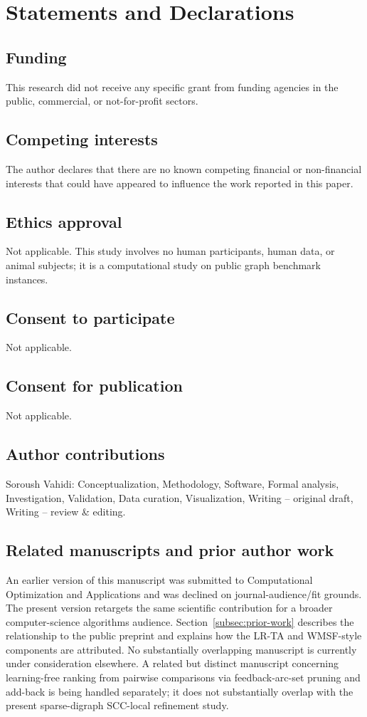 \section*{Statements and Declarations}

\subsection*{Funding}
This research did not receive any specific grant from funding agencies in the public, commercial, or not-for-profit sectors.

\subsection*{Competing interests}
The author declares that there are no known competing financial or non-financial interests that could have appeared to influence the work reported in this paper.

\subsection*{Ethics approval}
Not applicable. This study involves no human participants, human data, or animal subjects; it is a computational study on public graph benchmark instances.

\subsection*{Consent to participate}
Not applicable.

\subsection*{Consent for publication}
Not applicable.

\subsection*{Author contributions}
Soroush Vahidi: Conceptualization, Methodology, Software, Formal analysis, Investigation, Validation, Data curation, Visualization, Writing -- original draft, Writing -- review \& editing.

\subsection*{Related manuscripts and prior author work}
An earlier version of this manuscript was submitted to Computational Optimization and Applications and was declined on journal-audience/fit grounds. The present version retargets the same scientific contribution for a broader computer-science algorithms audience. Section~\ref{subsec:prior-work} describes the relationship to the public preprint \cite{VahidiKoutis2024arxiv} and explains how the LR-TA and WMSF-style components are attributed. No substantially overlapping manuscript is currently under consideration elsewhere. A related but distinct manuscript concerning learning-free ranking from pairwise comparisons via feedback-arc-set pruning and add-back is being handled separately; it does not substantially overlap with the present sparse-digraph SCC-local refinement study.

